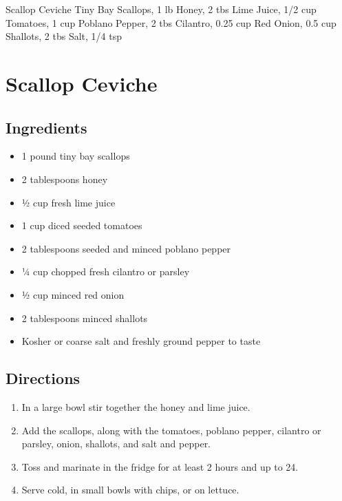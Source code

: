 Scallop Ceviche
  Tiny Bay Scallops, 1 lb
  Honey, 2 tbs
  Lime Juice, 1/2 cup
  Tomatoes, 1 cup
  Poblano Pepper, 2 tbs
  Cilantro, 0.25 cup
  Red Onion, 0.5 cup
  Shallots, 2 tbs
  Salt, 1/4 tsp

\section{ Scallop Ceviche }

\subsection{ Ingredients }

\begin{itemize}
  \item 1 pound tiny bay scallops
  \item 2 tablespoons honey
  \item ½ cup fresh lime juice
  \item 1 cup diced seeded tomatoes
  \item 2 tablespoons seeded and minced poblano pepper
  \item ¼ cup chopped fresh cilantro or parsley
  \item ½ cup minced red onion
  \item 2 tablespoons minced shallots
  \item Kosher or coarse salt and freshly ground pepper to taste
\end{itemize}

\subsection{ Directions }

\begin{enumerate}
  \item In a large bowl stir together the honey and lime juice. 
  \item Add the scallops, along with the tomatoes, poblano pepper, cilantro or parsley, onion, shallots, and salt and pepper. 
  \item Toss and marinate in the fridge for at least 2 hours and up to 24.
  \item Serve cold, in small bowls with chips, or on lettuce.
\end{enumerate}

